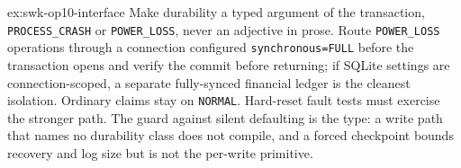 \documentclass[11pt,a4paper]{article}
\theoremstyle{definition}
\theoremstyle{remark}
\begin{document}
\begin{pdsolution}{ex:swk-op10-interface}
Make durability a typed argument of the transaction, \texttt{PROCESS\_CRASH} or \texttt{POWER\_LOSS}, never an adjective in prose. Route \texttt{POWER\_LOSS} operations through a connection configured \texttt{synchronous=FULL} before the transaction opens and verify the commit before returning; if SQLite settings are connection-scoped, a separate fully-synced financial ledger is the cleanest isolation. Ordinary claims stay on \texttt{NORMAL}. Hard-reset fault tests must exercise the stronger path. The guard against silent defaulting is the type: a write path that names no durability class does not compile, and a forced checkpoint bounds recovery and log size but is not the per-write primitive.
\end{pdsolution}

\end{document}
